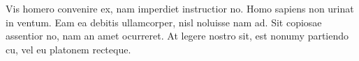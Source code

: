 \documentclass[a4paper,10pt]{article}
\begin{document}
Vis homero convenire ex, nam imperdiet instructior no. Homo sapiens non urinat in ventum. Eam ea debitis ullamcorper, nisl noluisse nam ad. Sit copiosae assentior no, nam an amet ocurreret. At legere nostro sit, est nonumy partiendo cu, vel eu platonem recteque.

{}


{\small \trollface}
\end{document}
